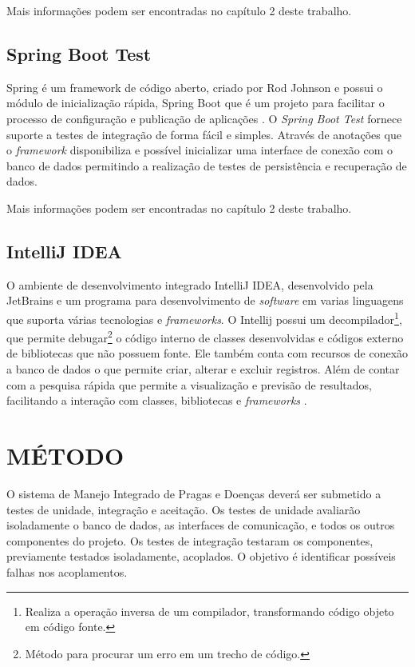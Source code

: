 Mais informações podem ser encontradas no capítulo 2 deste trabalho.

\subsection{Spring Boot Test}

 Spring é um framework de código aberto, criado por Rod Johnson e possui o módulo de inicialização rápida, Spring Boot que é um projeto para facilitar o processo de configuração e publicação de aplicações \cite{spring}. O \textit{Spring Boot Test}  fornece suporte a testes de integração de forma fácil e simples. Através de anotações que o \textit{framework} disponibiliza e possível inicializar uma interface de conexão com o banco de dados permitindo a realização de testes de persistência e recuperação de dados.


Mais informações podem ser encontradas no capítulo 2 deste trabalho.

\subsection{IntelliJ IDEA}

O ambiente de desenvolvimento integrado IntelliJ IDEA, desenvolvido pela JetBrains e um programa  para desenvolvimento de \textit{software} em varias linguagens que suporta várias tecnologias e \textit{frameworks}. O Intellij possui um decompilador\footnote{Realiza a operação inversa de um compilador, transformando código objeto em código fonte.}, que permite debugar\footnote{Método para procurar um erro em um trecho de código.} o código interno de classes desenvolvidas e códigos externo de bibliotecas que não possuem fonte. Ele também conta com recursos de conexão a banco de dados o que permite criar, alterar e excluir registros. Além de contar com a pesquisa rápida que permite a visualização e previsão de resultados, facilitando a interação com classes, bibliotecas e \textit{frameworks} \cite{intellij}.


\section{MÉTODO}

O sistema de Manejo Integrado de Pragas e Doenças deverá ser submetido a testes de unidade, integração e aceitação. Os testes de unidade avaliarão isoladamente o banco de dados, as interfaces de comunicação, e todos os outros componentes do projeto. Os testes de integração testaram os componentes, previamente testados isoladamente, acoplados. O objetivo é identificar possíveis falhas nos acoplamentos. 



